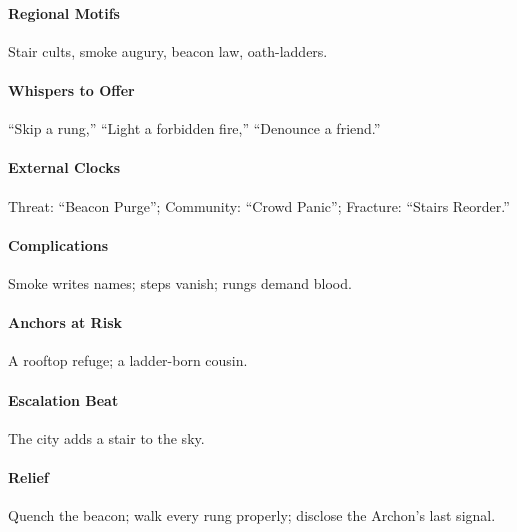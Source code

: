 \paragraph{Regional Motifs} Stair cults, smoke augury, beacon law, oath-ladders.
\paragraph{Whispers to Offer} ``Skip a rung,'' ``Light a forbidden fire,'' ``Denounce a friend.''
\paragraph{External Clocks} Threat: ``Beacon Purge''; Community: ``Crowd Panic''; Fracture: ``Stairs Reorder.''
\paragraph{Complications} Smoke writes names; steps vanish; rungs demand blood.
\paragraph{Anchors at Risk} A rooftop refuge; a ladder-born cousin.
\paragraph{Escalation Beat} The city adds a stair to the sky.
\paragraph{Relief} Quench the beacon; walk every rung properly; disclose the Archon’s last signal.

